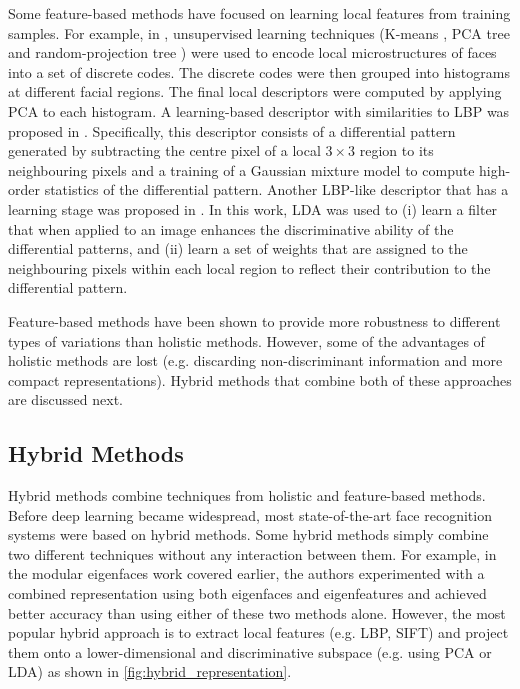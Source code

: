 \documentclass[conference]{IEEEtran}
\begin{document}
Some feature-based methods have focused on learning local features from training samples. For example, in \cite{cao2010face}, unsupervised learning techniques (K-means \cite{lloyd1982least}, PCA tree \cite{freund2008learning} and random-projection tree \cite{freund2008learning}) were used to encode local microstructures of faces into a set of discrete codes. The discrete codes were then grouped into histograms at different facial regions. The final local descriptors were computed by applying PCA to each histogram. A learning-based descriptor with similarities to LBP was proposed in \cite{sharma2012local}. Specifically, this descriptor consists of a differential pattern generated by subtracting the centre pixel of a local $3\times3$ region to its neighbouring pixels and a training of a Gaussian mixture model to compute high-order statistics of the differential pattern. Another LBP-like descriptor that has a learning stage was proposed in \cite{lei2014learning}. In this work, LDA was used to (i) learn a filter that when applied to an image enhances the discriminative ability of the differential patterns, and (ii) learn a set of weights that are assigned to the neighbouring pixels within each local region to reflect their contribution to the differential pattern.

Feature-based methods have been shown to provide more robustness to different types of variations than holistic methods. However, some of the advantages of holistic methods are lost (e.g. discarding non-discriminant information and more compact representations). Hybrid methods that combine both of these approaches are discussed next.


\subsection{Hybrid Methods}
\label{hybrid_methods}

Hybrid methods combine techniques from holistic and feature-based methods. Before deep learning became widespread, most state-of-the-art face recognition systems were based on hybrid methods. Some hybrid methods simply combine two different techniques without any interaction between them. For example, in the modular eigenfaces work \cite{pentland1994view} covered earlier, the authors experimented with a combined representation using both eigenfaces and eigenfeatures and achieved better accuracy than using either of these two methods alone. However, the most popular hybrid approach is to extract local features (e.g. LBP, SIFT) and project them onto a lower-dimensional and discriminative subspace (e.g. using PCA or LDA) as shown in \cref{fig:hybrid_representation}.
\end{document}

